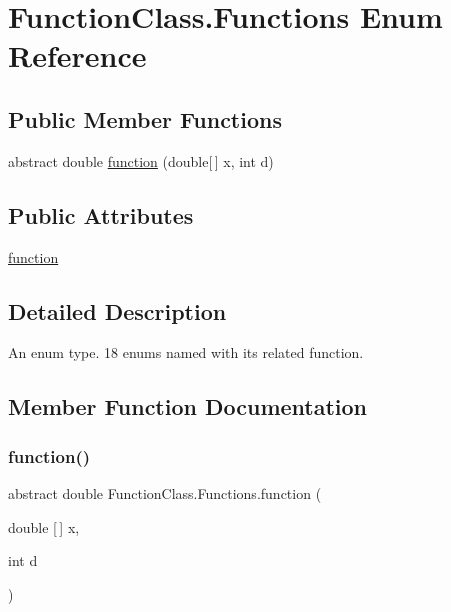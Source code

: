 \hypertarget{enum_function_class_1_1_functions}{}\section{Function\+Class.\+Functions Enum Reference}
\label{enum_function_class_1_1_functions}
\subsection*{Public Member Functions}
\begin{DoxyCompactItemize}
\item 
abstract double \mbox{\hyperlink{enum_function_class_1_1_functions_a421fd070408c0bad31e52e7349e712c8}{function}} (double\mbox{[}$\,$\mbox{]} x, int d)
\end{DoxyCompactItemize}
\subsection*{Public Attributes}
\begin{DoxyCompactItemize}
\item 
\mbox{\hyperlink{enum_function_class_1_1_functions_a4c02e6f15bcb371868f67221aa3fd7bd}{function}}
\end{DoxyCompactItemize}


\subsection{Detailed Description}
An enum type. 18 enums named with its related function. 

\subsection{Member Function Documentation}
\mbox{\label{enum_function_class_1_1_functions_a421fd070408c0bad31e52e7349e712c8}} 
\subsubsection{\texorpdfstring{function()}{function()}}
{\footnotesize\ttfamily abstract double Function\+Class.\+Functions.\+function (\begin{DoxyParamCaption}\item[{double \mbox{[}$\,$\mbox{]}}]{x,  }\item[{int}]{d }\end{DoxyParamCaption})\hspace{0.3cm}{\ttfamily [abstract]}}

